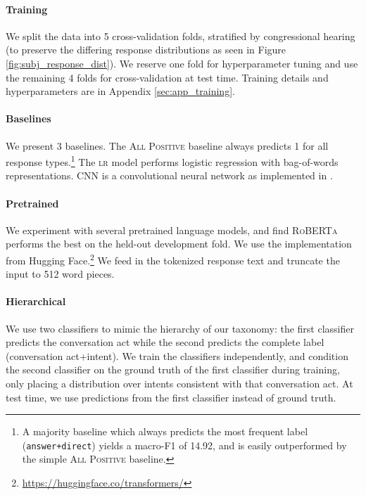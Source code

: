 \paragraph{Training} We split the data into 5 cross-validation folds, stratified by congressional hearing (to preserve the differing response distributions as seen in Figure \ref{fig:subj_response_dist}). We reserve one fold for hyperparameter tuning and use the remaining 4 folds for cross-validation at test time. Training details and hyperparameters are in Appendix \ref{sec:app_training}.

\paragraph{Baselines}
We present 3 baselines. The \textsc{All Positive} baseline always predicts 1 for all response types.\footnote{A majority baseline which always predicts the most frequent label (\texttt{answer+direct}) yields a macro-F1 of 14.92, and is easily outperformed by the simple \textsc{All Positive} baseline.} The \textsc{lr} model performs logistic regression with bag-of-words representations. \textsc{CNN} is a convolutional neural network as implemented in .

\paragraph{Pretrained} We experiment with several pretrained language models, and find \textsc{RoBERTa} \cite{Liu:2019} performs the best on the held-out development fold. We use the implementation from Hugging Face.\footnote{\url{https://huggingface.co/transformers/}} We feed in the tokenized response text and truncate the input to 512 word pieces. 

\paragraph{Hierarchical} We use two classifiers to mimic the hierarchy of our taxonomy: the first classifier predicts the conversation act while the second predicts the complete label (conversation act+intent). We train the classifiers independently, and condition the second classifier on the ground truth of the first classifier during training, only placing a distribution over intents consistent with that conversation act. %
At test time, we use predictions from the first classifier instead of  ground truth.

